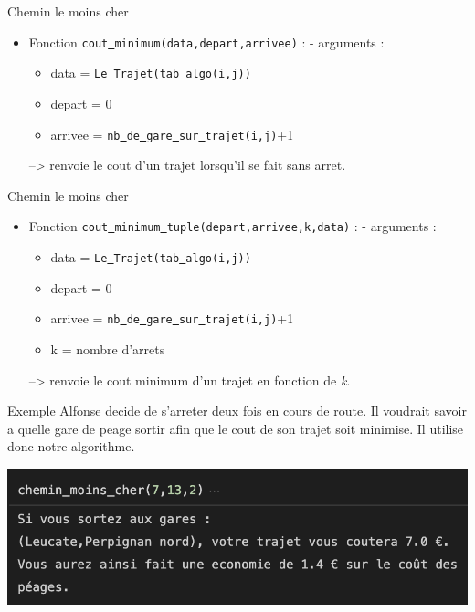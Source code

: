 \documentclass{beamer}
\begin{document}
 \begin{frame}{Chemin le moins cher}
 \begin{itemize}
     \item Fonction \texttt{cout\underline{ }minimum(data,depart,arrivee)} : \newline
     - arguments :
     \begin{itemize}
         \item data = \texttt{Le\underline{ }Trajet(tab\underline{ }algo(i,j))}
         \item depart = 0
         \item arrivee = \texttt{nb\underline{ }de\underline{ }gare\underline{ }sur\underline{ }trajet(i,j)}+1
     \end{itemize}
     --> renvoie le cout d'un trajet lorsqu'il se fait sans arret.
 \end{itemize}
 \end{frame}
 
 \begin{frame}{Chemin le moins cher}
 \begin{itemize}
 \item Fonction \texttt{cout\underline{ }minimum\underline{ }tuple(depart,arrivee,k,data)} : \newline
     - arguments :
     \begin{itemize}
         \item data = \texttt{Le\underline{ }Trajet(tab\underline{ }algo(i,j))}
         \item depart = 0
         \item arrivee = \texttt{nb\underline{ }de\underline{ }gare\underline{ }sur\underline{ }trajet(i,j)}+1
         \item k = nombre d'arrets
     \end{itemize}
     --> renvoie le cout minimum d'un trajet en fonction de \textit{k}.
 \end{itemize}
 \end{frame}
 
\begin{frame}{Exemple}
Alfonse decide de s'arreter deux fois en cours de route. Il voudrait savoir a quelle gare de peage sortir afin que le cout de son trajet soit minimise. Il utilise donc notre algorithme. \begin{center}
    \includegraphics[scale = 0.7]{cheminmoinscher.png}
\end{center}
\end{frame} 
 
\end{document}
